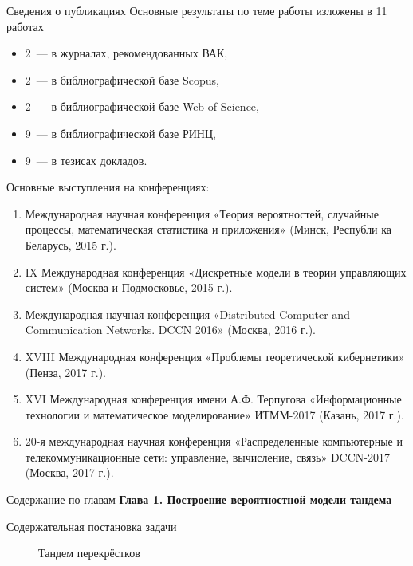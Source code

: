 \documentclass[10pt]{beamer}
\begin{document}
\begin{frame}{Сведения о публикациях}
Основные результаты по теме работы изложены в 11 работах
    \begin{itemize}
        \item 2~--- в журналах, рекомендованных ВАК,
        \item 2~--- в библиографической базе Scopus, 
        \item 2~--- в библиографической базе Web of Science, 
        \item 9~--- в библиографической базе РИНЦ,
        \item 9~--- в тезисах докладов.
    \end{itemize}
\end{frame}
\begin{frame}{Основные выступления на конференциях:}
  \begin{enumerate}
 \item Международная
научная конференция «Теория вероятностей, случайные процессы, математическая статистика и приложения» (Минск, Республи
ка Беларусь, 2015 г.).
\item IX Международная конференция «Дискретные модели в теории управляющих систем» (Москва и Подмосковье, 2015 г.).
\item Международная
научная конференция «Distributed Computer and Communication
Networks. DCCN 2016» (Москва, 2016 г.).
\item XVIII Международная конференция «Проблемы теоретической кибернетики» (Пенза, 2017 г.).
\item XVI Международная конференция имени А.Ф. Терпугова «Информационные
технологии и математическое моделирование» ИТММ-2017 (Казань, 2017 г.).
\item 20-я международная научная конференция «Распределенные компьютерные и телекоммуникационные сети: управление, вычисление, связь» DCCN-2017 (Москва, 2017 г.).
  \end{enumerate} 
  \end{frame}
  
  \begin{frame}{Содержание по главам}
  \Large{\textbf{Глава 1. Построение вероятностной модели тандема}}\par


      \end{frame}
  
\begin{frame}{Содержательная постановка задачи}
        \begin{figure}[h]
    \centering
    \caption{Тандем перекрёстков}
    \label{VK:fig:1}
  \end{figure}
\end{frame}
\end{document}
